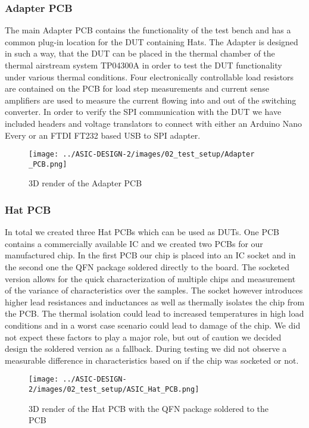 \subsubsection{Adapter PCB}
The main Adapter PCB contains the functionality of the test bench and has a common plug-in location for the \ac{DUT} containing Hats. The Adapter is designed in such a way, that the \ac{DUT} can be placed in the thermal chamber of the thermal airstream system TP04300A in order to test the \ac{DUT} functionality under various thermal conditions. Four electronically controllable load resistors are contained on the PCB for load step measurements and current sense amplifiers are used to measure the current flowing into and out of the switching converter. In order to verify the SPI communication with the \ac{DUT} we have included headers and voltage translators to connect with either an Arduino Nano Every or an FTDI FT232 based USB to SPI adapter.

\begin{figure}[h]
    \centering
    \texttt{[image: ../ASIC-DESIGN-2/images/02\_test\_setup/Adapter \_PCB.png]}
    \caption{3D render of the Adapter PCB}
    \label{fig:Adapter_PCB}
\end{figure}



\subsubsection{Hat PCB}
In total we created three Hat PCBs which can be used as \ac{DUT}s. One PCB contains a commercially available IC and we created two PCBs for our manufactured chip. In the first PCB our chip is placed into an \ac{IC} socket and in the second one the QFN package soldered directly to the board. The socketed version allows for the quick characterization of multiple chips and measurement of the variance of characteristics over the samples. The socket however introduces higher lead resistances and inductances as well as thermally isolates the chip from the PCB. The thermal isolation could lead to increased temperatures in high load conditions and in a worst case scenario could lead to damage of the chip. We did not expect these factors to play a major role, but out of caution we decided design the soldered version as a fallback. During testing we did not observe a measurable difference in characteristics based on if the chip was socketed or not.\\


\begin{figure}[h]
    \centering
    \texttt{[image: ../ASIC-DESIGN-2/images/02\_test\_setup/ASIC\_Hat\_PCB.png]}
    \caption{3D render of the Hat PCB with the QFN package soldered to the PCB}
    \label{fig:ASIC_Hat}
\end{figure}


